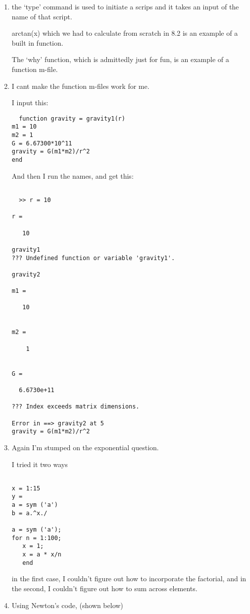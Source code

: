 \documentclass[aps,pre,nofootinbib]{revtex4}
\begin{document}
\begin{enumerate}
  \item the `type' command is used to initiate a scrips and it takes an input of the name of that script.

  arctan(x) which we had to calculate from scratch in 8.2 is an example of a built in function.

  The `why' function, which is admittedly just for fun, is an example of a function m-file.

  \item  I cant make the function m-files work for me.

  I input this:
\begin{verbatim}
  function gravity = gravity1(r)
m1 = 10
m2 = 1
G = 6.67300*10^11
gravity = G(m1*m2)/r^2
end
\end{verbatim}
  And then I run the names, and get this:

\begin{verbatim}

  >> r = 10

r =

   10

gravity1
??? Undefined function or variable 'gravity1'.

gravity2

m1 =

   10


m2 =

    1


G =

  6.6730e+11

??? Index exceeds matrix dimensions.

Error in ==> gravity2 at 5
gravity = G(m1*m2)/r^2
\end{verbatim}
\item

Again I'm stumped on the exponential question.

I tried it two ways
\begin{verbatim}

x = 1:15
y =
a = sym ('a')
b = a.^x./

a = sym ('a');
for n = 1:100;
   x = 1;
   x = a * x/n
   end
\end{verbatim}
   in the first case, I couldn't figure out how to incorporate the factorial, and in the second, I couldn't figure out how to sum across elements.

   \item

   Using Newton's code, (shown below)
\begin{verbatim}


\end{verbatim}
\end{enumerate}
\end{document}
